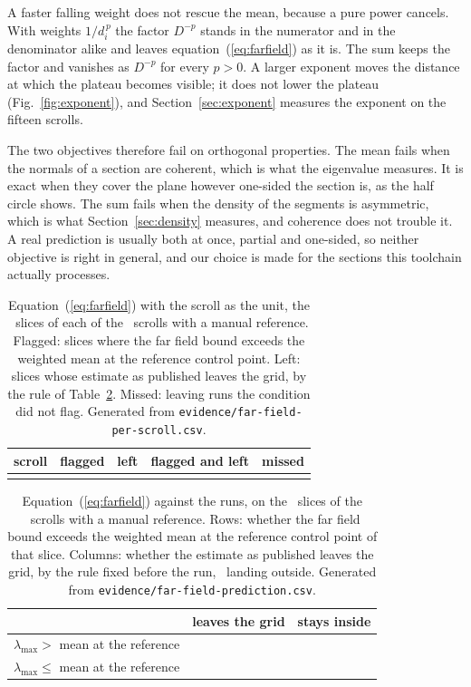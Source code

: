 A faster falling weight does not rescue the mean, because a pure power cancels. With weights
$1/d_i^{\,p}$ the factor $D^{-p}$ stands in the numerator and in the denominator alike and leaves
equation~(\ref{eq:farfield}) as it is. The sum keeps the factor and vanishes as $D^{-p}$ for every
$p>0$. A larger exponent moves the distance at which the plateau becomes visible; it does not lower
the plateau (Fig.~\ref{fig:exponent}), and Section~\ref{sec:exponent} measures the exponent on the
fifteen scrolls.

The two objectives therefore fail on orthogonal properties. The mean fails when the normals of a
section are coherent, which is what the eigenvalue measures. It is exact when they cover the
plane however one-sided the section is, as the half circle shows. The sum fails when the density
of the segments is asymmetric, which is what Section~\ref{sec:density} measures, and coherence
does not trouble it. A real prediction is usually both at once, partial and one-sided, so neither
objective is right in general, and our choice is made for the sections this toolchain actually
processes.

\begin{table}[t]
\caption{Equation~(\ref{eq:farfield}) with the scroll as the unit, the \RevFarScrollSlicesEach\
slices of each of the \RevFarScrollUnit\ scrolls with a manual reference. Flagged: slices where the
far field bound exceeds the weighted mean at the reference control point. Left: slices whose
estimate as published leaves the grid, by the rule of Table~\ref{tab:farfield}. Missed: leaving
runs the condition did not flag. Generated from \texttt{evidence/far-field-per-scroll.csv}.}
\label{tab:farfieldscrolls}
\centering
\footnotesize
\begin{tabular}{@{}lrrrr@{}}
\toprule
scroll & flagged & left & flagged and left & missed \\
\midrule
{}{rev1-far-field-scrolls}
\bottomrule
\end{tabular}
\end{table}

\begin{table}[t]
\caption{Equation~(\ref{eq:farfield}) against the runs, on the \RevFarSlicesTotal\ slices of the
\RevFarScrolls\ scrolls with a manual reference. Rows: whether the far field bound exceeds the
weighted mean at the reference control point of that slice. Columns: whether the estimate as
published leaves the grid, by the rule fixed before the run, \RevFarSliceSeedRule\ landing
outside. Generated from \texttt{evidence/far-field-prediction.csv}.}
\label{tab:farfield}
\centering
\footnotesize
\begin{tabular}{@{}lrr@{}}
\toprule
 & leaves the grid & stays inside \\
\midrule
$\lambda_{\max} >$ mean at the reference & \RevFarTruePos & \RevFarFalsePos \\
$\lambda_{\max} \leq$ mean at the reference & \RevFarFalseNeg & \RevFarTrueNeg \\
\bottomrule
\end{tabular}
\end{table}

